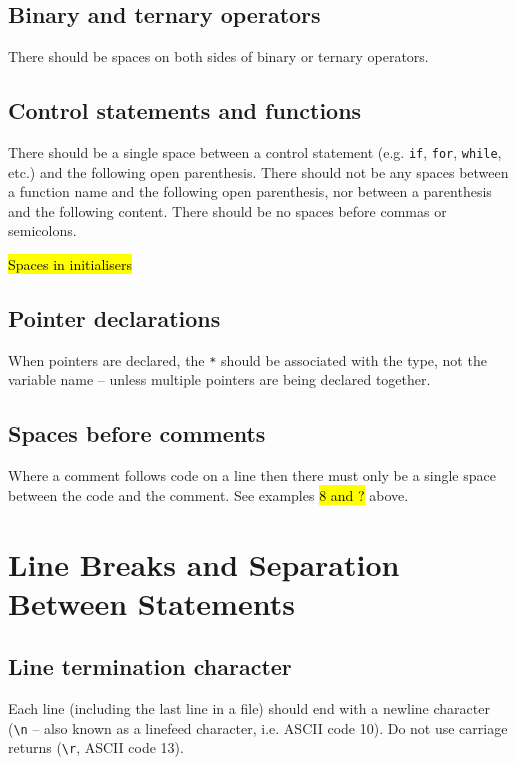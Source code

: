 \documentclass{article}
\begin{document}
\subsection{Binary and ternary operators}
There should be spaces on both sides of binary or ternary operators.

\nolinenumbers
{}

\linenumbers

\subsection{Control statements and functions}
There should be a single space between a control statement (e.g. \texttt{if}, \texttt{for}, \texttt{while}, etc.) and 
the following open parenthesis. There should not be any spaces between a function name and the following open parenthesis, nor between a parenthesis and the following content. There should be no spaces before commas or semicolons. 

\nolinenumbers
{}

\linenumbers

\hl{Spaces in initialisers}

\subsection{Pointer declarations}
When pointers are declared, the \texttt{*} should be associated with the type, not the variable name -- unless multiple 
pointers are being declared together.
\nolinenumbers
{}

\linenumbers

\subsection{Spaces before comments}
Where a comment follows code on a line then there must only be a single space between the code and the comment. See examples \hl{8 and ?} above.

\section{Line Breaks and Separation Between Statements}
\subsection{Line termination character}
Each line (including the last line in a file) should end with a newline character (\texttt{\textbackslash n} -- also known as a linefeed character, i.e. ASCII code 10). Do not use carriage returns (\texttt{\textbackslash r}, ASCII code 13).
\end{document}

